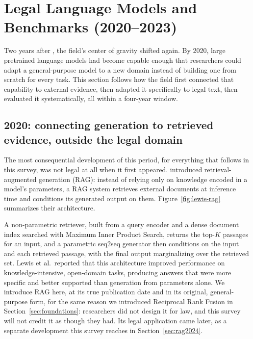 \section{Legal Language Models and Benchmarks (2020--2023)}
\label{sec:lm2023}

Two years after \citet{zhong2018}, the field's center of gravity shifted again. By 2020, large
pretrained language models had become capable enough that researchers could adapt a general-purpose
model to a new domain instead of building one from scratch for every task. This section follows how
the field first connected that capability to external evidence, then adapted it specifically to
legal text, then evaluated it systematically, all within a four-year window.

\subsection{2020: connecting generation to retrieved evidence, outside the legal domain}

The most consequential development of this period, for everything that follows in this survey, was
not legal at all when it first appeared. \citet{lewis2020} introduced retrieval-augmented generation
(RAG): instead of relying only on knowledge encoded in a model's parameters, a RAG system retrieves
external documents at inference time and conditions its generated output on them.
Figure~\ref{fig:lewis-rag} summarizes their architecture.



A non-parametric retriever, built from a query encoder and a dense document index searched with
Maximum Inner Product Search, returns the top-$K$ passages for an input, and a parametric seq2seq
generator then conditions on the input and each retrieved passage, with the final output
marginalizing over the retrieved set. Lewis et al.\ reported that this architecture improved
performance on knowledge-intensive, open-domain tasks, producing answers that were more specific and
better supported than generation from parameters alone. We introduce RAG here, at its true
publication date and in its original, general-purpose form, for the same reason we introduced
Reciprocal Rank Fusion in Section~\ref{sec:foundations}: researchers did not design it for law, and
this survey will not credit it as though they had. Its legal application came later, as a separate
development this survey reaches in Section~\ref{sec:rag2024}.

